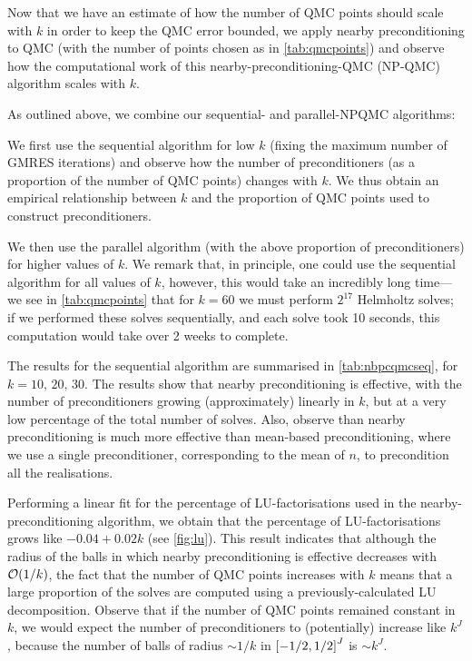 Now that we have an estimate of how the number of QMC points should scale with $k$ in order to keep the QMC error bounded, we apply nearby preconditioning to QMC (with the number of points chosen as in \cref{tab:qmcpoints}) and observe how the computational work of this nearby-preconditioning-QMC (NP-QMC) algorithm scales with $k.$

As outlined above, we combine our sequential- and parallel-NPQMC algorithms:\label{page:seqandpar}
\bit
\item We first use the sequential algorithm for low $k$ (fixing the maximum number of GMRES iterations) and observe how the number of preconditioners (as a proportion of the number of QMC points) changes with $k$. We thus obtain an empirical relationship between $k$ and the proportion of QMC points used to construct preconditioners.
  \item We then use the parallel algorithm (with the above proportion of preconditioners) for higher values of $k.$
    \eit
    We remark that, in principle, one could use the sequential algorithm for all values of $k$, however, this would take an incredibly long time--- we see in \cref{tab:qmcpoints} that for $k=60$ we must perform $2^{17}$ Helmholtz solves; if we performed these solves sequentially, and each solve took 10 seconds, this computation would take over 2 weeks to complete.

    The results for the sequential algorithm are summarised in \cref{tab:nbpcqmcseq}, for $k = 10,\,20,\,30$. The results show that nearby preconditioning is effective, with the number of preconditioners growing (approximately) linearly in $k$, but at a very low percentage of the total number of solves. Also, observe than nearby preconditioning is much more effective than mean-based preconditioning, where we use a single preconditioner, corresponding to the mean of $n$, to precondition all the realisations.

    Performing a linear fit for the percentage of LU-factorisations used in the nearby-pre\-con\-di\-tion\-ing algorithm, we obtain that the percentage of LU-factorisations grows like $-0.04 + 0.02k$ (see \cref{fig:lu}). This result indicates that although the radius of the balls in which nearby preconditioning is effective decreases with $\cO\mleft(1/k\mright)$, the fact that the number of QMC points increases with $k$ means that a large proportion of the solves are computed using a previously-calculated LU decomposition. Observe that if the number of QMC points remained constant in $k$, we would expect the number of preconditioners to (potentially) increase like $k^J$, because the number of balls of radius $\sim 1/k$ in $\cube{J}$ is $\sim k^J.$

